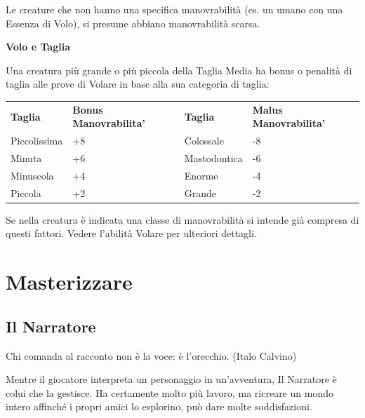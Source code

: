 \documentclass[a4paper,11pt,twoside,openany]{book}
\begin{document}
Le creature che non hanno una specifica manovrabilità (es. un umano con una Essenza di Volo), si presume abbiano manovrabilità scarsa.

\textbf{Volo e Taglia}

Una creatura più grande o più piccola della Taglia Media ha bonus o penalità di taglia alle prove di Volare in base alla sua categoria di taglia:

\medskip

\begin{tabular}{llll}
	\hline
	\textbf{Taglia} & \textbf{ Bonus Manovrabilita'} & \textbf{Taglia} & \textbf{ Malus Manovrabilita'} \\
	Piccolissima    & +8             & Colossale       & -8             \\
	Minuta          & +6             & Mastodontica    & -6             \\
	Minuscola       & +4             & Enorme          & -4             \\
	Piccola         & +2             & Grande          & -2             \\
\end{tabular}

Se nella creatura è indicata una classe di manovrabilità si intende già compresa di questi fattori. Vedere l'abilità Volare per ulteriori dettagli.

\pagebreak

\section{Masterizzare}

\label{masterizzare}


\subsection{Il Narratore}

\begin{tcolorbox}[enhanced,arc=5pt,boxrule=0.3pt]{Chi comanda al racconto non è la voce: è l'orecchio. (Italo Calvino)}\end{tcolorbox}\medskip


\label{il-narratore}

Mentre il giocatore interpreta un personaggio in un'avventura, Il Narratore è colui che la gestisce. Ha certamente molto più lavoro, ma ricreare un mondo intero affinché i propri amici lo esplorino, può dare molte soddisfazioni.
\end{document}
